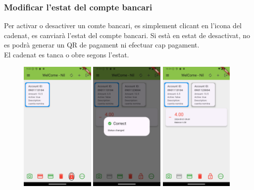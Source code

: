 \documentclass[a4paper,12pt,twoside]{ThesisStyle}
\begin{document}
\clearpage

\subsubsection{Modificar l'estat del compte bancari}
\label{subsubsec:Modificar l'estat del compte bancari}

Per activar o desactiver un comte bancari, es simplement clicant en l'icona del cadenat, es canviarà l'estat del compte bancari. Si està en estat de desactivat, no es podrà generar un QR de pagament ni efectuar cap pagament.\\

El cadenat es tanca o obre segons l'estat.

\begin{figure}[h]
    \centering
    \includegraphics[width=0.32\textwidth]{imatges/mainpageAccount5.png}
    \includegraphics[width=0.32\textwidth]{imatges/changeStatus1.png}
    \includegraphics[width=0.32\textwidth]{imatges/changeStatus2.png}

\end{figure}
\end{document}
